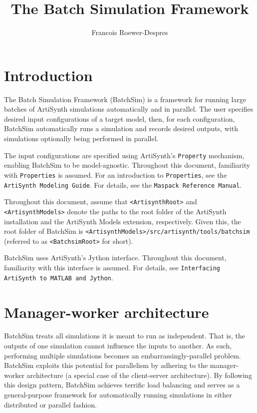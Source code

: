 \documentclass{article}
\newcommand{\AS}{<ArtisynthRoot>}
\newcommand{\AM}{<ArtisynthModels>}
\newcommand{\BS}{<BatchsimRoot>}
\begin{document}
\setcounter{tocdepth}{5}
\setcounter{secnumdepth}{3}

\title{The Batch Simulation Framework}
\author{Francois Roewer-Despres}

\iflatexml
\date{}
\fi

\maketitle

\iflatexml{\large\pubdate}\fi

\tableofcontents


\section{Introduction}

The Batch Simulation Framework (BatchSim) is a framework for running large batches of ArtiSynth simulations automatically and in parallel. The user specifies desired input configurations of a target model, then, for each configuration, BatchSim automatically runs a simulation and records desired outputs, with simulations optionally being performed in parallel.

The input configurations are specified using ArtiSynth's {\tt Property} mechanism, enabling BatchSim to be model-agnostic. Throughout this document, familiarity with {\tt Properties} is assumed. For an introduction to {\tt Properties}, see the {\tt ArtiSynth Modeling Guide}. For details, see the {\tt Maspack Reference Manual}.

Throughout this document, assume that {\tt \AS} and {\tt \AM} denote the paths to the root folder of the ArtiSynth installation and the ArtiSynth Models extension, respectively. Given this, the root folder of BatchSim is {\tt \AM/src/artisynth/tools/batchsim} (referred to as {\tt \BS} for short).

BatchSim uses ArtiSynth's Jython interface. Throughout this document, familiarity with this interface is assumed. For details, see {\tt Interfacing ArtiSynth to MATLAB and Jython}.

\section{Manager-worker architecture}

BatchSim treats all simulations it is meant to run as independent. That is, the outputs of one simulation cannot influence the inputs to another. As such, performing multiple simulations becomes an embarrassingly-parallel problem. BatchSim exploits this potential for parallelism by adhering to the manager-worker architecture (a special case of the client-server architecture). By following this design pattern, BatchSim achieves terrific load balancing and serves as a general-purpose framework for automatically running simulations in either distributed or parallel fashion.
\end{document}

